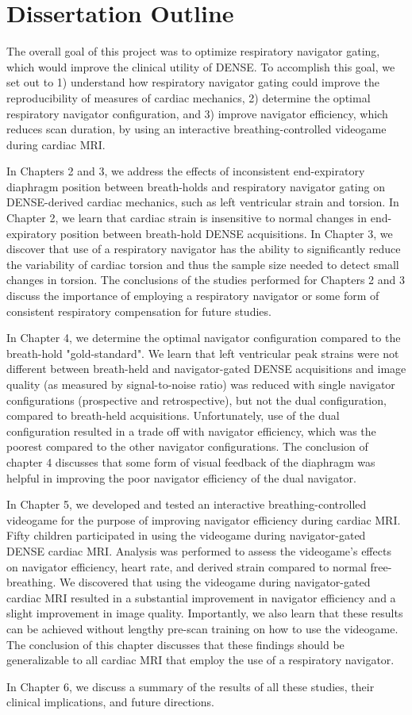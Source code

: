 \section{Dissertation Outline}
	The overall goal of this project was to optimize respiratory navigator gating, which would improve the clinical utility of DENSE. To accomplish this goal, we set out to 1) understand how respiratory navigator gating could improve the reproducibility of measures of cardiac mechanics, 2) determine the optimal respiratory navigator configuration, and 3) improve navigator efficiency, which reduces scan duration, by using an interactive breathing-controlled videogame during cardiac MRI.
	
	\indent In Chapters 2 and 3, we address the effects of inconsistent end-expiratory diaphragm position between breath-holds and respiratory navigator gating on DENSE-derived cardiac mechanics, such as left ventricular strain and torsion. In Chapter 2, we learn that cardiac strain is insensitive to normal changes in end-expiratory position between breath-hold DENSE acquisitions. In Chapter 3, we discover that use of a respiratory navigator has the ability to significantly reduce the variability of cardiac torsion and thus the sample size needed to detect small changes in torsion. The conclusions of the studies performed for Chapters 2 and 3 discuss the importance of employing a respiratory navigator or some form of consistent respiratory compensation for future studies.
	
	\indent In Chapter 4, we determine the optimal navigator configuration compared to the breath-hold "gold-standard". We learn that left ventricular peak strains were not different between breath-held and navigator-gated DENSE acquisitions and image quality (as measured by signal-to-noise ratio) was reduced with single navigator configurations (prospective and retrospective), but not the dual configuration, compared to breath-held acquisitions. Unfortunately, use of the dual configuration resulted in a trade off with navigator efficiency, which was the poorest compared to the other navigator configurations. The conclusion of chapter 4 discusses that some form of visual feedback of the diaphragm was helpful in improving the poor navigator efficiency of the dual navigator.
	
	\indent In Chapter 5, we developed and tested an interactive breathing-controlled videogame for the purpose of improving navigator efficiency during cardiac MRI. Fifty children participated in using the videogame during navigator-gated DENSE cardiac MRI. Analysis was performed to assess the videogame's effects on navigator efficiency, heart rate, and derived strain compared to normal free-breathing. We discovered that using the videogame during navigator-gated cardiac MRI resulted in a substantial improvement in navigator efficiency and a slight improvement in image quality. Importantly, we also learn that these results can be achieved without lengthy pre-scan training on how to use the videogame. The conclusion of this chapter discusses that these findings should be generalizable to all cardiac MRI that employ the use of a respiratory navigator.
	
	\indent In Chapter 6, we discuss a summary of the results of all these studies, their clinical implications, and future directions.


